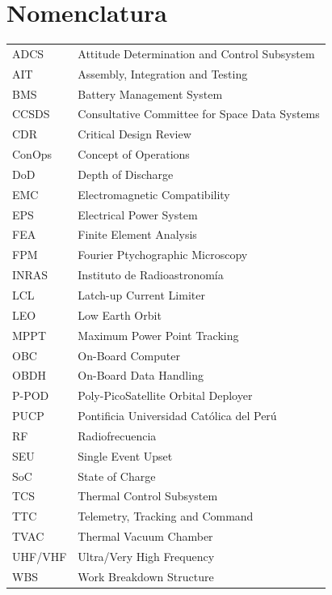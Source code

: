 \documentclass[12pt]{report}
\begin{document}
\chapter*{Nomenclatura}
\begin{tabular}{ll}
ADCS    & Attitude Determination and Control Subsystem \\
AIT     & Assembly, Integration and Testing \\
BMS     & Battery Management System \\
CCSDS   & Consultative Committee for Space Data Systems \\
CDR     & Critical Design Review \\
ConOps  & Concept of Operations \\
DoD     & Depth of Discharge \\
EMC     & Electromagnetic Compatibility \\
EPS     & Electrical Power System \\
FEA     & Finite Element Analysis \\
FPM     & Fourier Ptychographic Microscopy \\
INRAS   & Instituto de Radioastronomía \\
LCL     & Latch-up Current Limiter \\
LEO     & Low Earth Orbit \\
MPPT    & Maximum Power Point Tracking \\
OBC     & On-Board Computer \\
OBDH    & On-Board Data Handling \\
P-POD   & Poly-PicoSatellite Orbital Deployer \\
PUCP    & Pontificia Universidad Católica del Perú \\
RF      & Radiofrecuencia \\
SEU     & Single Event Upset \\
SoC     & State of Charge \\
TCS     & Thermal Control Subsystem \\
TTC     & Telemetry, Tracking and Command \\
TVAC    & Thermal Vacuum Chamber \\
UHF/VHF & Ultra/Very High Frequency \\
WBS     & Work Breakdown Structure \\
\end{tabular}

\clearpage
\tableofcontents
\clearpage













\appendix


\end{document}
